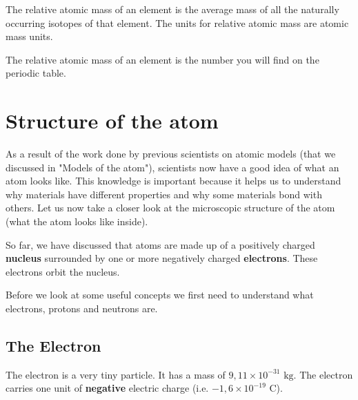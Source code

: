  {The relative atomic mass of an element is the average mass of all the naturally occurring isotopes of that element. The units for relative atomic mass are atomic mass units.} 

The relative atomic mass of an element is the number you will find on the periodic table.  
         \section{Structure of the atom}
    \nopagebreak
    \label{m38745*cid4}
            \nopagebreak
      \label{m38745*id255206}As a result of the work done by previous scientists on atomic models (that we discussed in "Models of the atom"), scientists now have a good idea of what an atom looks like. This knowledge is important because it helps us to understand why materials have different properties and why some materials bond with others. Let us now take a closer look at the microscopic structure of the atom (what the atom looks like inside). \par 
{}
      \label{m38745*id255216}So far, we have discussed that atoms are made up of a positively charged \textbf{nucleus} surrounded by
one or more negatively charged \textbf{electrons}. These electrons orbit the nucleus.\par 
      \label{m38745*eip-577}Before we look at some useful concepts we first need to understand what electrons, protons and neutrons are.\par \label{m38745*uid10}
            \subsection*{The Electron}
            \nopagebreak
The electron is a very tiny particle. It has a mass of $9,11 \times {10}^{-31} \text{ kg}$.
 The electron carries one unit of \textbf{negative} electric charge (i.e. $-1,6 \times {10}^{-19} \text{ C}$).
      \label{m38745*uid11}
